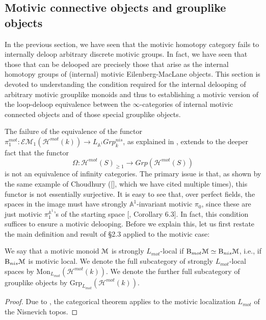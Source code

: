 \subsection{Motivic connective objects and grouplike objects}
In the previous section, we have seen that the motivic homotopy category fails to internally deloop arbitrary discrete motivic groups. In fact, we have seen that those that can be delooped are precisely those that arise as the internal homotopy groups of (internal) motivic Eilenberg-MacLane objects. This section is devoted to understanding the condition required for the internal delooping of arbitrary motivic grouplike monoids and thus to establishing a motivic version of the loop-deloop equivalence between the $\infty$-categories of internal motivic connected objects and of those special grouplike objects.

The failure of the equivalence of the functor $\pi_1^{mot}:\mathcal{EM}_1(\mathcal{H}^{mot}(k))\to L_{\mathbb{A}^1}Grp_k^{nis}$, as explained in , extends to the deeper fact that the functor $$\Omega: \mathcal{H}^{mot}(S)_{\geq 1}\to  Grp(\mathcal{H}^{mot}(S))$$ is not an equivalence of infinity categories. The primary issue is that, as shown by the same example of Choudhury ([\cite{choudhury2014connectivity}], which we have cited multiple times), this functor is not essentially surjective. It is easy to see that, over perfect fields, the spaces in the image must have strongly $\mathbb{A}^1$-invariant motivic $\pi_0$, since these are just motivic $\pi_1^{\mathbb{A}^1}$'s of the starting space [\cite{morel2012a1}, Corollary 6.3]. In fact, this condition suffices to ensure a motivic delooping. Before we explain this, let us first restate the main definition and result of \S2.3 applied to the motivic case:
\begin{defn}
We say that a motivic monoid $\EuScript{M}$ is strongly $L_{mot}$-local if $\mathrm{B}_{mot}\EuScript{M}\simeq \mathrm{B}_{nis}\EuScript{M}$, i.e., if $\mathrm{B}_{nis}\EuScript{M}$ is motivic local. We denote the full subcategory of strongly $L_{mot}$-local spaces by $\mathrm{Mon}_{L_{mot}}(\mathcal{H}^{mot}(k))$. We denote the further full subcategory of grouplike objects by $\mathrm{Grp}_{L_{mot}}(\mathcal{H}^{mot}(k))$.
\end{defn}
\begin{proof}
         Due to , the categorical theorem  applies to the motivic localization $L_{mot}$ of the Nisnevich topos.
\end{proof}
    
